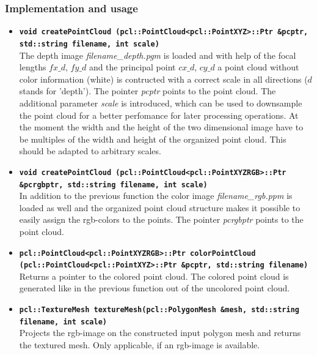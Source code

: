 \documentclass[paper=a4,11pt,bibliography=totoc]{scrartcl}
\begin{document}
\subsubsection*{\color{darkred}Implementation and usage}
%
\begin{itemize}
\item \textbf{\texttt{void createPointCloud (pcl::PointCloud<pcl::PointXYZ>::Ptr \&pcptr,\\std::string filename, int scale)}}\\
\textsf{The depth image \textit{filename\_depth.pgm} is loaded and with help of the focal lengths $fx\_d$, $fy\_d$ and the principal point $cx\_d$, $cy\_d$ a point cloud without color information (white) is contructed with a correct scale in all directions ($d$ stands for 'depth'). The pointer \textit{pcptr} points to the point cloud. The additional parameter \textit{scale} is introduced, which can be used to downsample the point cloud for a better perfomance for later processing operations. At the moment the width and the height of the two dimensional image have to be multiples of the width and height of the organized point cloud. This should be adapted to arbitrary scales.}
 
\item \textbf{\texttt{void createPointCloud (pcl::PointCloud<pcl::PointXYZRGB>::Ptr\\\&pcrgbptr, std::string filename, int scale)}}\\
\textsf{In addition to the previous function the color image \textit{filename\_rgb.ppm} is loaded as well and the organized point cloud structure makes it possible to easily assign the rgb-colors to the points. The pointer \textit{pcrgbptr} points to the point cloud.}
 
\item \textbf{\texttt{pcl::PointCloud<pcl::PointXYZRGB>::Ptr colorPointCloud\\(pcl::PointCloud<pcl::PointXYZ>::Ptr \&pcptr, std::string filename)}}\\
\textsf{Returns a pointer  to the colored point cloud. The colored point cloud is generated like in the previous function out of the uncolored point cloud.}
 
\item \textbf{\texttt{pcl::TextureMesh textureMesh(pcl::PolygonMesh \&mesh, std::string\\ filename, int scale)}}\\
\textsf{Projects the rgb-image on the constructed input polygon mesh and returns the textured mesh. Only applicable, if an rgb-image is available.}
\end{itemize}
%
\end{document}
